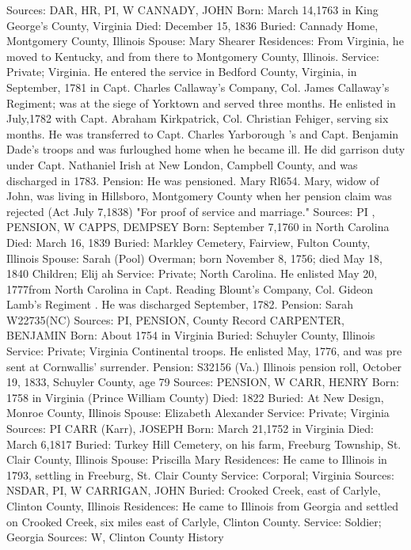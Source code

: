 Sources: DAR, HR, PI, W 
CANNADY, JOHN 
Born: March 14,1763 in King George's County, Virginia 
Died: December 15, 1836 
Buried: Cannady Home, Montgomery County, Illinois 
Spouse: Mary Shearer 
Residences: From Virginia, he moved to Kentucky, and from there to Montgomery County, Illinois. 
Service: Private; Virginia. He entered the service in Bedford County, Virginia, in September, 1781 in Capt. Charles Callaway's Company, Col. James Calla­way's Regiment; was at the siege of Yorktown and served three months. He enlisted in July,1782 with Capt. Abraham Kirkpatrick, Col. Christian Fehiger, serving six months. He was transferred to Capt. Charles Yarborough 's and Capt. Benjamin Dade's troops and was furloughed home when he became ill. He did garrison duty under Capt. Nathaniel Irish at New London, Camp­bell County, and was discharged in 1783. 
Pension: He was pensioned. Mary Rl654. Mary, widow of John, was living in Hillsboro, Montgomery County when her pension claim was rejected (Act July 7,1838) "For proof of service and marriage." 
Sources: PI , PENSION, W 
CAPPS, DEMPSEY 
Born: September 7,1760 in North Carolina 
Died: March 16, 1839 
Buried: Markley Cemetery, Fairview, Fulton County, Illinois 
Spouse: Sarah (Pool) Overman; born November 8, 1756; died May 18, 1840 Children; Elij ah 
Service: Private; North Carolina. He enlisted May 20, 1777from North Carolina in Capt. Reading Blount's Company, Col. Gideon Lamb's Regiment . He was discharged September, 1782. 
Pension: Sarah W22735(NC) 
Sources: PI, PENSION, County Record 
CARPENTER, BENJAMIN 
Born: About 1754 in Virginia 
Buried: Schuyler County, Illinois 
Service: Private; Virginia Continental troops. He enlisted May, 1776, and was pre sent at Cornwallis' surrender. 
Pension: S32156 (Va.) Illinois pension roll, October 19, 1833, Schuyler County, age 79 
Sources: PENSION, W 
CARR, HENRY 
Born: 1758 in Virginia (Prince William County) 
Died: 1822 
Buried: At New Design, Monroe County, Illinois 
Spouse: Elizabeth Alexander 
Service: Private; Virginia 
Sources: PI 
CARR (Karr), JOSEPH 
Born: March 21,1752 in Virginia 
Died: March 6,1817 
Buried: Turkey Hill Cemetery, on his farm, Freeburg Township, St. Clair County, Illinois 
Spouse: Priscilla Mary 
Residences: He came to Illinois in 1793, settling in Freeburg, St. Clair County 
Service: Corporal; Virginia 
Sources: NSDAR, PI, W 
CARRIGAN, JOHN 
Buried: Crooked Creek, east of Carlyle, Clinton County, Illinois 
Residences: He came to Illinois from Georgia and settled on Crooked Creek, six miles east of Carlyle, Clinton County. 
Service: Soldier; Georgia 
Sources: W, Clinton County History 
